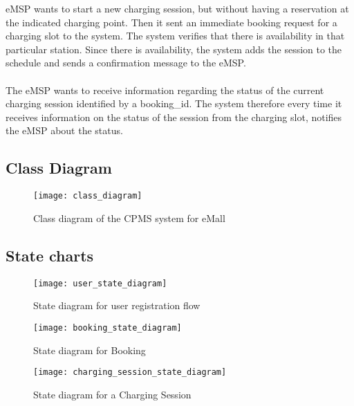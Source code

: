 \begin{enumerate}
	eMSP wants to start a new charging session, but without having a reservation at the indicated charging point. Then it sent an immediate booking request for a charging slot to the system. The system verifies that there is availability in that particular station. Since there is availability, the system adds the session to the schedule and sends a confirmation message to the eMSP.\\
	
	
	\\
	The eMSP wants to receive information regarding the status of the current charging session identified by a booking\_id. The system therefore every time it receives information on the status of the session from the charging slot, notifies the eMSP about the status.\\
	
\end{enumerate}

\newpage

\subsection{Class Diagram}

\begin{figure}[h]
\centering
\texttt{[image: class\_diagram]}
\caption{Class diagram of the CPMS system for eMall}
\end{figure}

\clearpage
\newpage

\subsection{State charts}

\begin{figure}[h]
\centering
\texttt{[image: user\_state\_diagram]}
\caption{State diagram for user registration flow}
\end{figure}

\begin{figure}[h]
\centering
\texttt{[image: booking\_state\_diagram]}
\caption{State diagram for Booking}
\end{figure}

\begin{figure}[h]
\centering
\texttt{[image: charging\_session\_state\_diagram]}
\caption{State diagram for a Charging Session}
\end{figure}

